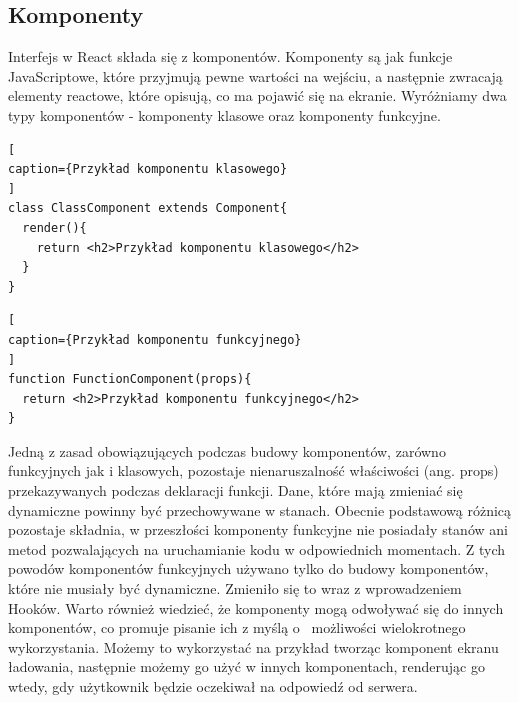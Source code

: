 \documentclass[oneside,polski,logo,indent]{amuthesis}
\begin{document}
\subsection{Komponenty}
{
Interfejs w React składa się z komponentów. Komponenty są jak funkcje JavaScriptowe, które przyjmują pewne wartości na wejściu, a następnie zwracają elementy reactowe, które opisują, co ma pojawić się na ekranie.
Wyróżniamy dwa typy komponentów - komponenty klasowe oraz komponenty funkcyjne.
\begin{lstlisting}[
caption={Przykład komponentu klasowego}
]
class ClassComponent extends Component{
  render(){
    return <h2>Przykład komponentu klasowego</h2>
  }
}
\end{lstlisting}
\begin{lstlisting}[
caption={Przykład komponentu funkcyjnego}
]
function FunctionComponent(props){
  return <h2>Przykład komponentu funkcyjnego</h2>
}
\end{lstlisting}
Jedną z zasad obowiązujących podczas budowy komponentów, zarówno funkcyjnych jak i klasowych, pozostaje nienaruszalność właściwości    (ang. props) przekazywanych podczas deklaracji funkcji. Dane, które mają zmieniać się dynamiczne powinny być przechowywane w stanach.
Obecnie podstawową różnicą pozostaje składnia, w przeszłości komponenty funkcyjne nie posiadały stanów ani metod pozwalających na uruchamianie kodu w odpowiednich momentach. Z tych powodów komponentów funkcyjnych używano tylko do budowy komponentów, które nie musiały być dynamiczne. Zmieniło się to wraz z wprowadzeniem Hooków.
Warto również wiedzieć, że komponenty mogą odwoływać się do innych komponentów, co promuje pisanie ich z myślą o~ możliwości wielokrotnego wykorzystania. Możemy to wykorzystać na przykład tworząc komponent ekranu ładowania, następnie możemy go użyć w innych komponentach, renderując go wtedy, gdy użytkownik będzie oczekiwał na odpowiedź od serwera.
}
\end{document}
